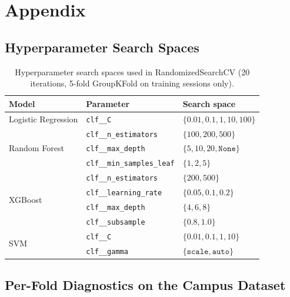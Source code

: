 \chapter{Appendix}
\label{ch:appendix}

\section{Hyperparameter Search Spaces}
\label{app:hyperparams}

\begin{table}[H]
\centering
\caption{Hyperparameter search spaces used in RandomizedSearchCV (20 iterations, 5-fold GroupKFold on training sessions only).}
\label{tab:hp_search}
\begin{tabular}{lll}
\toprule
\textbf{Model} & \textbf{Parameter} & \textbf{Search space} \\
\midrule
Logistic Regression & \texttt{clf\_\_C}                   & $\{0.01, 0.1, 1, 10, 100\}$ \\
\midrule
\multirow{3}{*}{Random Forest}
                    & \texttt{clf\_\_n\_estimators}       & $\{100, 200, 500\}$ \\
                    & \texttt{clf\_\_max\_depth}          & $\{5, 10, 20, \texttt{None}\}$ \\
                    & \texttt{clf\_\_min\_samples\_leaf}  & $\{1, 2, 5\}$ \\
\midrule
\multirow{4}{*}{XGBoost}
                    & \texttt{clf\_\_n\_estimators}       & $\{200, 500\}$ \\
                    & \texttt{clf\_\_learning\_rate}      & $\{0.05, 0.1, 0.2\}$ \\
                    & \texttt{clf\_\_max\_depth}          & $\{4, 6, 8\}$ \\
                    & \texttt{clf\_\_subsample}           & $\{0.8, 1.0\}$ \\
\midrule
\multirow{2}{*}{SVM}
                    & \texttt{clf\_\_C}                   & $\{0.01, 0.1, 1, 10\}$ \\
                    & \texttt{clf\_\_gamma}               & $\{\texttt{scale}, \texttt{auto}\}$ \\
\bottomrule
\end{tabular}
\end{table}

\section{Per-Fold Diagnostics on the Campus Dataset}
\label{app:fold_diagnostics}

